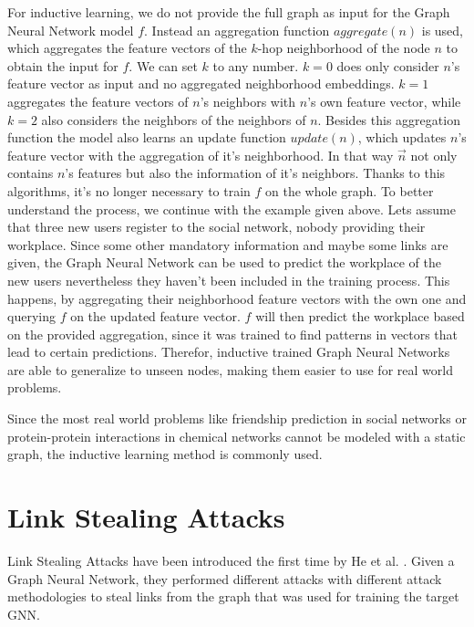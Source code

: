       For inductive learning, we do not provide the full graph as input for the Graph Neural Network model $f$.
      Instead an aggregation function $aggregate(n)$ is used, which aggregates the feature vectors of the $k$-hop neighborhood of the node $n$ to obtain the input for $f$. 
      We can set $k$ to any number.
      $k = 0$ does only consider $n$'s feature vector as input and no aggregated neighborhood embeddings.
      $k = 1$ aggregates the feature vectors of $n$'s neighbors with $n$'s own feature vector, while $k = 2$ also considers the neighbors of the neighbors of $n$.
      Besides this aggregation function the model also learns an update function $update(n)$, which updates $n$'s feature vector with the aggregation of it's neighborhood.
      In that way $\overrightarrow{n}$ not only contains $n$'s features but also the information of it's neighbors.
      Thanks to this algorithms, it's no longer necessary to train $f$ on the whole graph.
      To better understand the process, we continue with the example given above.
      Lets assume that three new users register to the social network, nobody providing their workplace.
      Since some other mandatory information and maybe some links are given, the Graph Neural Network can be used to predict the workplace of the new users nevertheless they haven't been included in the training process.
      This happens, by aggregating their neighborhood feature vectors with the own one and querying $f$ on the updated feature vector.
      $f$ will then predict the workplace based on the provided aggregation, since it was trained to find patterns in vectors that lead to certain predictions.
      Therefor, inductive trained Graph Neural Networks are able to generalize to unseen nodes, making them easier to use for real world problems.
      
      Since the most real world problems like friendship prediction in social networks or protein-protein interactions in chemical networks cannot be modeled with a static graph, the inductive learning method is commonly used.
      
  \section{Link Stealing Attacks}
    
    Link Stealing Attacks have been introduced the first time by He et al. \cite{DBLP:journals/corr/abs-2005-02131}.
    Given a Graph Neural Network, they performed different attacks with different attack methodologies to steal links from the graph that was used for training the target GNN.

